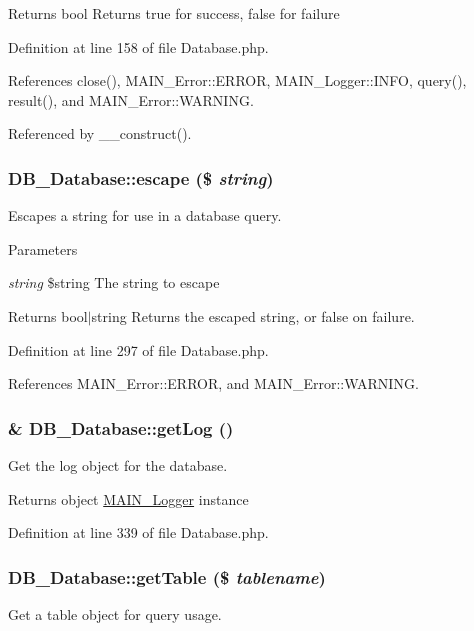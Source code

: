 \begin{DoxyReturn}{Returns}
bool Returns true for success, false for failure 
\end{DoxyReturn}


Definition at line 158 of file Database.php.

References close(), MAIN\_\-Error::ERROR, MAIN\_\-Logger::INFO, query(), result(), and MAIN\_\-Error::WARNING.

Referenced by \_\-\_\-construct().\hypertarget{classDB__Database_af8c352a06f1cff03f2c782b9aa431b44}{
\subsubsection[{escape}]{\setlength{\rightskip}{0pt plus 5cm}DB\_\-Database::escape (\$ {\em string})}}
\label{d3/d63/classDB__Database_af8c352a06f1cff03f2c782b9aa431b44}
Escapes a string for use in a database query.


\begin{DoxyParams}{Parameters}
\item[{\em string}]\$string The string to escape\end{DoxyParams}
\begin{DoxyReturn}{Returns}
bool$|$string Returns the escaped string, or false on failure. 
\end{DoxyReturn}


Definition at line 297 of file Database.php.

References MAIN\_\-Error::ERROR, and MAIN\_\-Error::WARNING.\hypertarget{classDB__Database_a98b8b2e954b888100ca2b6c00be811be}{
\subsubsection[{getLog}]{\setlength{\rightskip}{0pt plus 5cm}\& DB\_\-Database::getLog ()}}
\label{d3/d63/classDB__Database_a98b8b2e954b888100ca2b6c00be811be}
Get the log object for the database.

\begin{DoxyReturn}{Returns}
object \hyperlink{classMAIN__Logger}{MAIN\_\-Logger} instance 
\end{DoxyReturn}


Definition at line 339 of file Database.php.\hypertarget{classDB__Database_a3c1f6f79bdf1a2f2d019fd4fbf156819}{
\subsubsection[{getTable}]{\setlength{\rightskip}{0pt plus 5cm}DB\_\-Database::getTable (\$ {\em tablename})}}
\label{d3/d63/classDB__Database_a3c1f6f79bdf1a2f2d019fd4fbf156819}
Get a table object for query usage.

